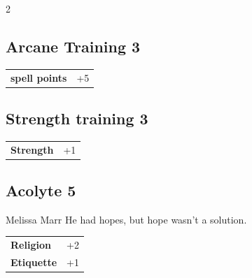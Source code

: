 \begin{multicols}{2}
\begin{tcolorbox}
\end{tcolorbox}

\begin{tcolorbox}
    \subsection*{Arcane Training \hfill \small{3 }}
    \tcblower




\begin{tabular}{@{}ll@{}}
    \textbf{spell points} & +5\\
\end{tabular}


\end{tcolorbox}

\begin{tcolorbox}
    \subsection*{Strength training \hfill \small{3 }}
    \tcblower




\begin{tabular}{@{}ll@{}}
    \textbf{Strength} & +1\\
\end{tabular}


\end{tcolorbox}

\begin{tcolorbox}
    \subsection*{Acolyte \hfill \small{5 }}
    \tcblower


\begin{pquote}{Melissa Marr}
He had hopes, but hope wasn't a solution.
\end{pquote}

\vspace{3mm}

\begin{tabular}{@{}ll@{}}
    \textbf{Religion} & +2\\
    \textbf{Etiquette} & +1\\
\end{tabular}


\end{tcolorbox}
\end{multicols}
